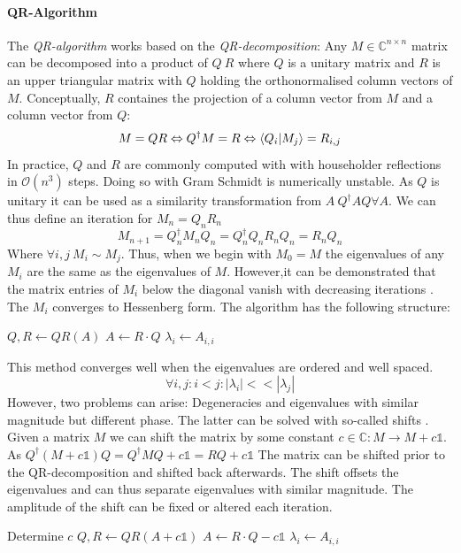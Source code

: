 \documentclass[Master]{subfiles}
\begin{document}
\paragraph {QR-Algorithm}
The \textit{QR-algorithm} works based on the \textit{QR-decomposition}: Any $M \in \mathbb{C}^{n\times n}$ matrix can be decomposed into a product of $Q\ R$ where $Q$ is a unitary matrix and $R$ is an upper triangular matrix with $Q$ holding the orthonormalised column vectors of $M$. Conceptually, $R$ containes the projection of a column vector from $M$ and a column vector from $Q$:
$$ M = QR \Leftrightarrow  Q^{\dag}M = R  \Leftrightarrow \braket{Q_i}{M_j} = R_{i,j}$$ 
In practice, $Q$ and $R$ are commonly computed with with householder reflections in  $\mathcal{O}(n^3)$ steps. Doing so with Gram Schmidt is numerically unstable. 
As $Q$ is unitary it can be used as a similarity transformation from $A ~ Q^{\dag}A Q \forall A$.
We can thus define an iteration for $M_n = Q_n R_n$
$$ M_{n+1} = Q_n^{\dag}M_n Q_n = Q_n^{\dag}Q_n R_n Q_n  =  R_n Q_n $$ 
Where $\forall i,j \ M_i \sim M_j$. Thus, when we begin with $M_0 = M$ the eigenvalues of any $M_i$ are the same as the eigenvalues of $M$. However,it can be demonstrated that the matrix entries of $M_i$ below the diagonal vanish with decreasing iterations \cite{bai1989block}. The $M_i$ converges to Hessenberg form.
The algorithm has the following structure:
\begin{algorithm}[H]
\caption{QR-Algorithm}\label{num:QR}
\begin{algorithmic}[1]
\Procedure{}{}
 
\State $Q,R \gets QR(A)$ 
\State $A \gets R \cdot Q$
\EndWhile
\State $\lambda_i \gets A_{i,i}$ 
\EndProcedure
\end{algorithmic}
\end{algorithm}
This method converges well when the eigenvalues are ordered and well spaced.
$$\forall i,j : i < j : |\lambda_i| << |\lambda_j|$$
However, two problems can arise: Degeneracies and eigenvalues with similar magnitude but different phase. The latter can be solved with so-called shifts \cite{bai1989block}. Given a matrix $M$ we can shift the matrix by some constant $c \in \mathbb{C} : M \rightarrow M + c \mathbb{1}$. As 
$Q^{\dag} ( M + c \mathbb{1} )Q = Q^{\dag} M Q+ c \mathbb{1} = R Q+ c \mathbb{1}$ The matrix can be shifted prior to the QR-decomposition and shifted back afterwards. The shift offsets the eigenvalues and can thus separate eigenvalues with similar magnitude. The amplitude of the shift can be fixed or altered each iteration. 
\begin{algorithm}[H]
\caption{QR-Algorithm with Shifts}\label{num:QRShift}
\begin{algorithmic}[1]
\Procedure{}{}
 
\State Determine $c$ 
\State $Q,R \gets QR(A + c \mathbb{1})$ 
\State $A \gets R \cdot Q - c \mathbb{1}$
\EndWhile
\State $\lambda_i \gets A_{i,i}$ 
\EndProcedure
\end{algorithmic}
\end{algorithm}
\end{document}
